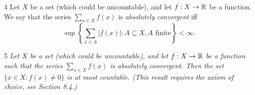 \begin{definition}{4}
    \label{arbitrary-set-sum}
    Let $X$ be a set (which could be uncountable), and let $f: X \to \mathbb{R}$ be a
    function. We say that the series $\sum_{x \in X} f(x)$ is \emph{absolutely convergent}
    iff
    \begin{equation*}
        \sup \left\{ \sum_{x \in A} |f(x)| : A \subseteq X, A \text{ finite} \right\} < \infty.
    \end{equation*}
\end{definition}

\begin{lemma}{5}
    \label{arbitrary-sum-countable-support}
    \emph{Let $X$ be a set (which could be uncountable), and let $f: X \to \mathbb{R}$
    be a function such that the series $\sum_{x \in X} f(x)$ is absolutely convergent.
    Then the set $\{x \in X : f(x) \neq 0\}$ is at most countable. (This result
    requires the axiom of choice, see Section 8.4.)}
\end{lemma}

